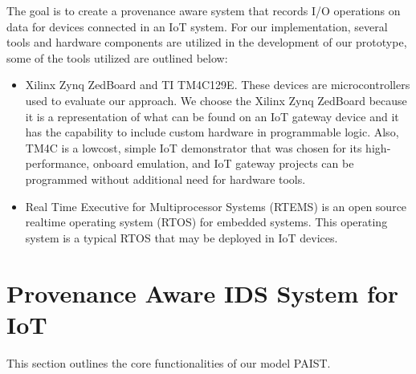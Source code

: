 The goal is to create a provenance aware system that records I/O operations on data for devices connected in an IoT system. For our implementation, several tools and hardware components are utilized in the development of our prototype, some of the tools utilized are outlined below:

\begin{itemize}
\item Xilinx Zynq ZedBoard and TI TM4C129E. These devices are microcontrollers used to evaluate our approach. We choose the Xilinx Zynq ZedBoard because it is a representation of what can be found on an IoT gateway device and it has the capability to include custom hardware in programmable logic. Also, TM4C is a low­cost, simple IoT demonstrator that was chosen for its high­performance, on­board emulation, and IoT gateway projects can be programmed without additional need for hardware tools.

\item Real Time Executive for Multiprocessor Systems (RTEMS) is an open source real­time operating system (RTOS) for embedded systems. This operating system is a typical RTOS that may be deployed in IoT devices.

\end{itemize}


\section{Provenance Aware IDS System for IoT }

This section outlines the core functionalities of our model PAIST. 